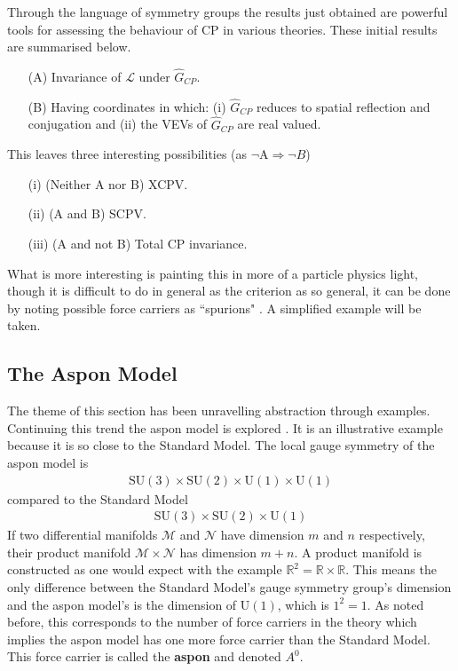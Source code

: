 Through the language of symmetry groups the results just obtained are powerful tools for assessing the behaviour of CP in various theories. These initial results are summarised below.
\begin{itemize}
\item[(A)] Invariance of $\mathcal{L}$ under $\hat{G}_{CP}$.
\item[(B)] Having coordinates in which: (i) $\hat{G}_{CP}$ reduces to spatial reflection and conjugation and (ii) the VEVs of $\hat{G}_{CP}$ are real valued.
\end{itemize}
This leaves three interesting possibilities  (as $\lnot$A$\Rightarrow\lnot B$) 
\begin{itemize}
\item[(i)] (Neither A nor B) XCPV. 
\item[(ii)] (A and B) SCPV.
\item[(iii)] (A and not B) Total CP invariance.
\end{itemize}
What is more interesting is painting this in more of a particle physics light, though it is difficult to do in general as the criterion as so general, it can be done by noting possible force carriers as ``spurions" \cite{SCPV5}. A simplified example will be taken.\\

\subsection{The Aspon Model}

The theme of this section has been unravelling abstraction through examples. Continuing this trend the aspon model is explored \cite{SCPV7}. It is an illustrative example because it is so close to the Standard Model. The local gauge symmetry of the aspon model is
\begin{align*}
\mathrm{SU}(3) \times \mathrm{SU}(2) \times \mathrm{U}(1) \times \mathrm{U}(1)
\end{align*}
compared to the Standard Model
\begin{align*}
\mathrm{SU}(3) \times \mathrm{SU}(2) \times \mathrm{U}(1)
\end{align*}
If two differential manifolds $\mathcal{M}$ and $\mathcal{N}$ have dimension $m$ and $n$ respectively, their product manifold $\mathcal{M} \times \mathcal{N}$ has dimension $m+n$. A product manifold is constructed as one would expect with the example $\mathbb{R}^2 = \mathbb{R}\times \mathbb{R}$. This means the only difference between the Standard Model's gauge symmetry group's dimension and the aspon model's is the dimension of $\mathrm{U}(1)$, which is $1^2=1$. As noted before, this corresponds to the number of force carriers in the theory which implies the aspon model has one more force carrier than the Standard Model. This force carrier is called the \textbf{aspon} and denoted $A^0$.

